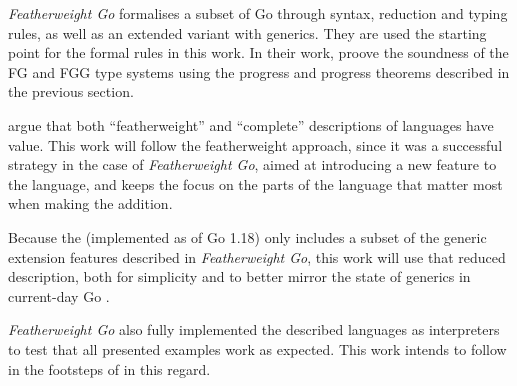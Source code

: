 \emph{Featherweight Go} formalises a subset of Go through syntax, reduction and
typing rules, as well as an extended variant with generics. They are used the
starting point for the formal rules in this work. In their work, \citeauthor{fg}
proove the soundness of the FG and FGG type systems using the progress and
progress theorems described in the previous section.

\citeauthor{fg} argue that both ``featherweight'' and ``complete'' descriptions
of languages have value. This work will follow the featherweight approach, since
it was a successful strategy in the case of \emph{Featherweight Go}, aimed at
introducing a new feature to the language, and keeps the focus on the parts of
the language that matter most when making the addition.

Because the  (implemented as of Go 1.18) only
includes a subset of the generic extension features described in
\emph{Featherweight Go}, this work will use that reduced description, both for
simplicity and to better mirror the state of generics in current-day Go
\autocite{genericsProposal}.

\emph{Featherweight Go} also fully implemented the described languages as
interpreters to test that all presented examples work as expected. This work
intends to follow in the footsteps of \citeauthor{fg} in this regard.

